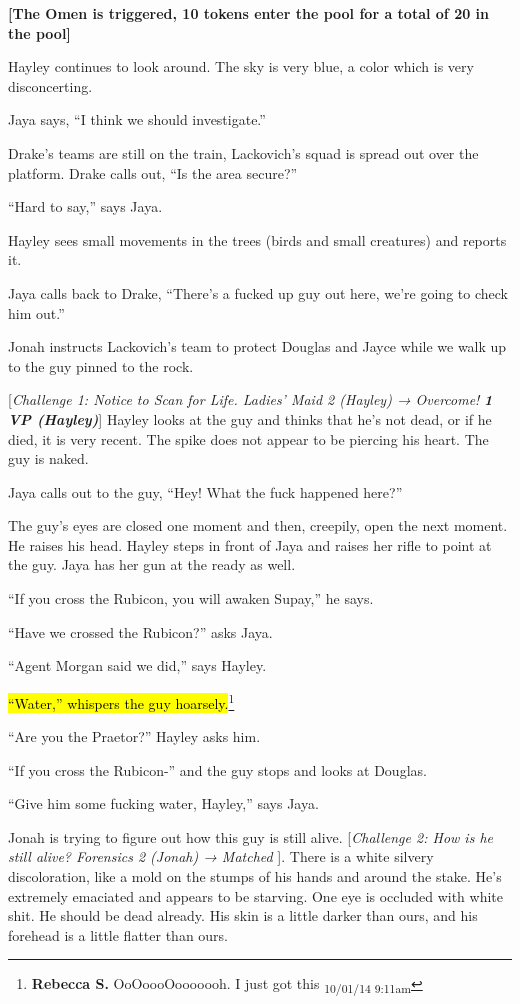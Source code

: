\textbf{{[}The Omen is triggered, 10 tokens enter the pool for a total of 20 in the pool{]}}



Hayley continues to look around.  The sky is very blue, a color which is very disconcerting.

Jaya says, ``I think we should investigate.''

Drake's teams are still on the train, Lackovich's squad is spread out over the platform.  Drake calls out, ``Is the area secure?''

``Hard to say,'' says Jaya.  

Hayley sees small movements in the trees (birds and small creatures) and reports it.  

Jaya calls back to Drake, ``There's a fucked up guy out here, we're going to check him out.''

Jonah instructs Lackovich's team to protect Douglas and Jayce while we walk up to the guy pinned to the rock.



{[}\textit{Challenge 1: Notice to Scan for Life.  Ladies' Maid 2 (Hayley) → Overcome! }\textit{\textbf{1 VP (Hayley)}}{]}  Hayley looks at the guy and thinks that he's not dead, or if he died, it is very recent.  The spike does not appear to be piercing his heart.  The guy is naked.

Jaya calls out to the guy, ``Hey!  What the fuck happened here?''

The guy's eyes are closed one moment and then, creepily, open the next moment. He raises his head.  Hayley steps in front of Jaya and raises her rifle to point at the guy.  Jaya has her gun at the ready as well.

``If you cross the Rubicon, you will awaken Supay,'' he says.

``Have we crossed the Rubicon?'' asks Jaya.

``Agent Morgan said we did,'' says Hayley. 

\hl{``Water,'' whispers the guy hoarsely.}\footnote{\textbf{Rebecca S. }OoOoooOooooooh.  I just got this \textsubscript{10/01/14 9:11am}}

``Are you the Praetor?'' Hayley asks him.

``If you cross the Rubicon-'' and the guy stops and looks at Douglas.

``Give him some fucking water, Hayley,'' says Jaya.

Jonah is trying to figure out how this guy is still alive.  {[}\textit{Challenge 2:  How is he still alive?  Forensics 2 (Jonah) → Matched }{]}. There is a white silvery discoloration, like a mold on the stumps of his hands and around the stake.  He's extremely emaciated and appears to be starving.  One eye is occluded with white shit.  He should be dead already.  His skin is a little darker than ours, and his forehead is a little flatter than ours.

